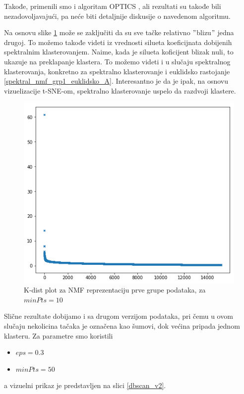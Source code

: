 \documentclass[a4paper]{article}
\begin{document}
Takođe, primenili smo i algoritam OPTICS \cite{ankerst1999optics}, ali rezultati su takođe bili nezadovoljavajući, pa neće biti detaljnije diskusije o navedenom algoritmu.

Na osnovu slike \ref{kdist_plot} može se zaključiti da su sve tačke relativno $"$blizu$"$ jedna drugoj. To možemo takođe videti iz vrednosti silueta koeficijnata dobijenih spektralnim klasterovanjem. Naime, kada je silueta koficijent blizak nuli, to ukazuje na preklapanje klastera. To možemo videti i u slučaju spektralnog klasterovanja, konkretno za spektralno klasterovanje i euklidsko rastojanje \ref{spektral_nmf_grp1_euklidsko_A}. Interesantno je da je ipak, na osnovu vizuelizacije t-SNE-om, spektralno klasterovanje uspelo da razdvoji klastere.


\begin{figure}[h!]
\centering
\includegraphics[scale=0.45]{kdist_plot}
\caption{K-dist plot za NMF reprezentaciju prve grupe podataka, za $minPts=10$}
\label{kdist_plot}
\end{figure}

Slične rezultate dobijamo i sa drugom verzijom podataka, pri čemu u ovom slučaju nekolicina tačaka je označena kao šumovi, dok većina pripada jednom klasteru. Za parametre smo koristili 
\begin{itemize}
\item $eps = 0.3$
\item $minPts = 50$
\end{itemize}
a vizuelni prikaz je predstavljen na slici \ref{dbscan_v2}.
\end{document}
